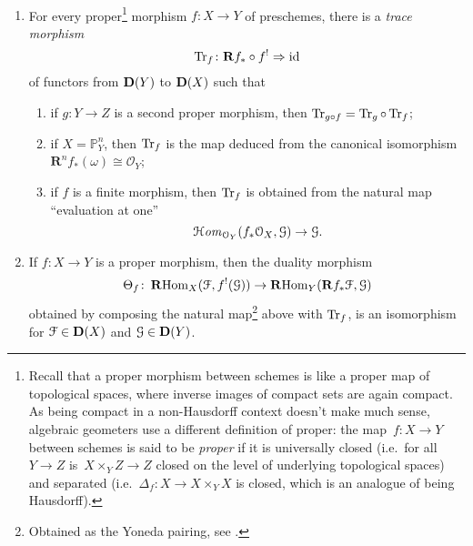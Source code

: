 \documentclass[10pt,a4paper]{article}
\begin{document}
\begin{theorem} {\ }
\begin{enumerate}
\begin{enumerate}
          \begin{equation}
            f^!(\mathcal{G})=\HHom_{\mathcal{O}_Y}(f_*\mathcal{O}_X,\mathcal{G}).
          \end{equation}
      \end{enumerate}
    \item\label{enumerate:classical-b} For every proper\footnote{Recall that a proper morphism between schemes is like a proper map of topological spaces, where inverse images of compact sets are again compact. As being compact in a non-Hausdorff context doesn't make much sense, algebraic geometers use a different definition of proper: the map~$f\colon X\to Y$ between schemes is said to be \emph{proper} if it is universally closed (i.e.\ for all~$Y\to Z$ is~$X\times_YZ\to Z$ closed on the level of underlying topological spaces) and separated (i.e.~$\Delta_f\colon X\to X\times_YX$ is closed, which is an analogue of being Hausdorff).} morphism $f\colon X\to Y$ of preschemes, there is a \emph{trace morphism}
      \begin{equation}
        \operatorname{Tr}_f\colon\mathbf{R} f_*\circ f^!\Rightarrow\mathrm{id}
      \end{equation}
      of functors from $\mathbf{D}(Y)$ to $\mathbf{D}(X)$ such that
      \begin{enumerate}
        \item\label{enumerate:classical-b-1} if $g\colon Y\to Z$ is a second proper morphism, then $\operatorname{Tr}_{g\circ f}=\operatorname{Tr}_g\circ\operatorname{Tr}_f$;
        \item\label{enumerate:classical-b-2} if $X=\mathbb{P}_Y^n$, then $\operatorname{Tr}_f$ is the map deduced from the canonical isomorphism $\mathbf{R}^nf_*(\omega)\cong\mathcal{O}_Y$;
        \item\label{enumerate:classical-b-3} if $f$ is a finite morphism, then $\operatorname{Tr}_f$ is obtained from the natural map ``evaluation at one''
          \begin{equation}
            \operatorname{\mathcal{H}\mathit{om}}_{\mathcal{O}_Y}(f_*\mathcal{O}_X,\mathcal{G})\to\mathcal{G}.
          \end{equation}
      \end{enumerate}
    \item\label{enumerate:classical-c} If $f\colon X\to Y$ is a proper morphism, then the duality morphism
      \begin{equation}
        \Theta_f\colon\operatorname{\mathbf{R}Hom}_X(\mathcal{F},f^!(\mathcal{G}))\to\operatorname{\mathbf{R}Hom}_Y(\mathbf{R}f_*\mathcal{F},\mathcal{G})
      \end{equation}
      obtained by composing the natural map\footnote{Obtained as the Yoneda pairing, see \cite[page 5]{hartshorne-residues-and-duality}.} above with $\operatorname{Tr}_f$, is an isomorphism for $\mathcal{F}\in\mathbf{D}(X)$ and $\mathcal{G}\in\mathbf{D}(Y)$.
  \end{enumerate}
\end{theorem}
\end{document}
